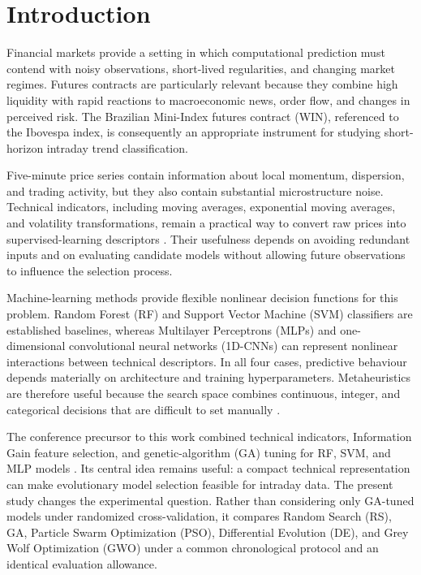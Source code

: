 \section{Introduction}\label{sec:introduction}

Financial markets provide a setting in which computational prediction must contend with noisy observations, short-lived regularities, and changing market regimes. Futures contracts are particularly relevant because they combine high liquidity with rapid reactions to macroeconomic news, order flow, and changes in perceived risk. The Brazilian Mini-Index futures contract (WIN), referenced to the Ibovespa index, is consequently an appropriate instrument for studying short-horizon intraday trend classification.

Five-minute price series contain information about local momentum, dispersion, and trading activity, but they also contain substantial microstructure noise. Technical indicators, including moving averages, exponential moving averages, and volatility transformations, remain a practical way to convert raw prices into supervised-learning descriptors \cite{hunter1986exponentially,rahim2025technical}. Their usefulness depends on avoiding redundant inputs and on evaluating candidate models without allowing future observations to influence the selection process.

Machine-learning methods provide flexible nonlinear decision functions for this problem. Random Forest (RF) and Support Vector Machine (SVM) classifiers are established baselines, whereas Multilayer Perceptrons (MLPs) and one-dimensional convolutional neural networks (1D-CNNs) can represent nonlinear interactions between technical descriptors. In all four cases, predictive behaviour depends materially on architecture and training hyperparameters. Metaheuristics are therefore useful because the search space combines continuous, integer, and categorical decisions that are difficult to set manually \cite{goldberg1989ga,kennedy1995pso,storn1997de,faris2018gwo_review}.

The conference precursor to this work combined technical indicators, Information Gain feature selection, and genetic-algorithm (GA) tuning for RF, SVM, and MLP models \cite{souza2026ijcnn}. Its central idea remains useful: a compact technical representation can make evolutionary model selection feasible for intraday data. The present study changes the experimental question. Rather than considering only GA-tuned models under randomized cross-validation, it compares Random Search (RS), GA, Particle Swarm Optimization (PSO), Differential Evolution (DE), and Grey Wolf Optimization (GWO) under a common chronological protocol and an identical evaluation allowance.

